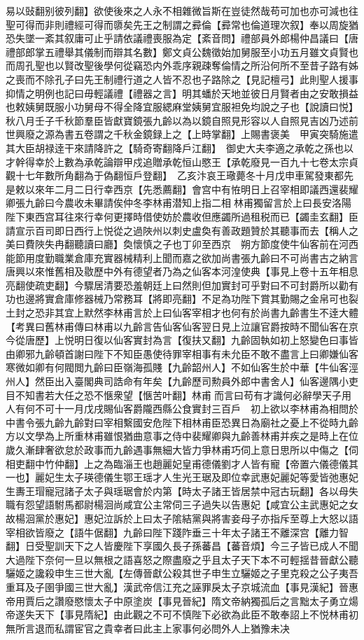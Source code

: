 易以䜴翻别彼列翻】欲使後來之人永不相雜微旨斯在豈徒然哉苟可加也亦可減也往聖可得而非則禮經可得而隳矣先王之制謂之彛倫【彛常也倫道理次叙】奉以周旋猶恐失墜一紊其叙庸可止乎請依議禮喪服為定【紊音問】禮部員外郎楊仲昌議曰【唐禮部郎掌五禮舉其儀制而辯其名數】鄭文貞公魏徵始加舅服至小功五月雖文貞賢也而周孔聖也以賢改聖後學何從竊恐内外乖序親疎奪倫情之所沿何所不至昔子路有姊之喪而不除孔子曰先王制禮行道之人皆不忍也子路除之【見記檀弓】此則聖人援事抑情之明例也記曰毋輕議禮【禮器之言】明其蟠於天地並彼日月賢者由之安敢損益也敕姨舅既服小功舅母不得全降宜服緦麻堂姨舅宜服袒免均說之子也【說讀曰悦】　秋八月壬子千秋節羣臣皆獻寶鏡張九齡以為以鏡自照見形容以人自照見吉凶乃述前世興廢之源為書五卷謂之千秋金鏡録上之【上時掌翻】上賜書褒美　甲寅突騎施遣其大臣胡禄逹干來請降許之【騎奇寄翻降戶江翻】　御史大夫李適之承乾之孫也以才幹得幸於上數為承乾論辯甲戍追贈承乾恒山愍王【承乾廢見一百九十七卷太宗貞觀十七年數所角翻為于偽翻恒戶登翻】　乙亥汴哀王璥薨冬十月戊申車駕發東都先是敕以來年二月二日行幸西京【先悉薦翻】會宫中有恠明日上召宰相即議西還裴耀卿張九齡曰今農收未畢請俟仲冬李林甫潜知上指二相林甫獨留言於上曰長安洛陽陛下東西宫耳往來行幸何更擇時借使妨於農收但應蠲所過租税而已【蠲圭玄翻】臣請宣示百司即日西行上悦從之過陜州以刺史盧奐有善政題贊於其聽事而去【稱人之美曰費陜失冉翻聽讀曰廳】奐懷慎之子也丁卯至西京　朔方節度使牛仙客前在河西能節用度勤職業倉庫充實器械精利上聞而嘉之欲加尚書張九齡曰不可尚書古之納言唐興以來惟舊相及敭歷中外有德望者乃為之仙客本河湟使典【事見上卷十五年相息亮翻使疏吏翻】今驟居清要恐羞朝廷上曰然則但加實封可乎對曰不可封爵所以勸有功也邊將實倉庫修器械乃常務耳【將即亮翻】不足為功陛下賞其勤賜之金帛可也裂土封之恐非其宜上默然李林甫言於上曰仙客宰相才也何有於尚書九齡書生不逹大體　【考異曰舊林甫傳曰林甫以九齡言告仙客仙客翌日見上泣讓官爵按時不聞仙客在京今從唐歷】上悦明日復以仙客實封為言【復扶又翻】九齡固執如初上怒變色曰事皆由卿邪九齡頓首謝曰陛下不知臣愚使待罪宰相事有未允臣不敢不盡言上曰卿嫌仙客寒微如卿有何閥閲九齡曰臣嶺海孤賤【九齡韶州人】不如仙客生於中華【牛仙客涇州人】然臣出入臺閣典司誥命有年矣【九齡歷司勲員外郎中書舍人】仙客邊隅小吏目不知書若大任之恐不愜衆望【愜苦叶翻】林甫而言曰苟有才識何必辭學天子用人有何不可十一月戊戌賜仙客爵隴西縣公食實封三百戶　初上欲以李林甫為相問於中書令張九齡九齡對曰宰相繫國安危陛下相林甫臣恐異日為廟社之憂上不從時九齡方以文學為上所重林甫雖恨猶曲意事之侍中裴耀卿與九齡善林甫并疾之是時上在位歲久漸肆奢欲怠於政事而九齡遇事無細大皆力爭林甫巧伺上意日思所以中傷之【伺相吏翻中竹仲翻】上之為臨淄王也趙麗妃皇甫德儀劉才人皆有寵【帝置六儀德儀其一也】麗妃生太子瑛德儀生鄂王瑶才人生光王琚及即位幸武惠妃麗妃等愛皆弛惠妃生夀王瑁寵冠諸子太子與瑶琚會於内第【時太子諸王皆居禁中冠古玩翻】各以母失職有怨望語駙馬都尉楊洄尚咸宜公主常伺三子過失以告惠妃【咸宜公主武惠妃之女故楊洄黨於惠妃】惠妃泣訴於上曰太子隂結黨與將害妾母子亦指斥至尊上大怒以語宰相欲皆廢之【語牛倨翻】九齡曰陛下踐阼垂三十年太子諸王不離深宫【離力智翻】日受聖訓天下之人皆慶陛下享國久長子孫蕃昌【蕃音煩】今三子皆已成人不聞大過陛下奈何一旦以無根之語喜怒之際盡廢之乎且太子天下本不可輕揺昔晉獻公聽驪姬之讒殺申生三世大亂【左傳晉獻公殺其世子申生立驪姬之子里克殺之公子夷吾重耳及子圉爭國三世大亂】漢武帝信江充之誣罪戾太子京城流血【事見漢紀】晉惠帝用賈后之讚廢愍懷太子中原塗炭【事見晉紀】隋文帝納獨孤后之言黜太子勇立煬帝遂失天下【事見隋紀】由此觀之不可不慎陛下必欲為此臣不敢奉詔上不悦林甫初無所言退而私謂宦官之貴幸者曰此主上家事何必問外人上猶豫未决
